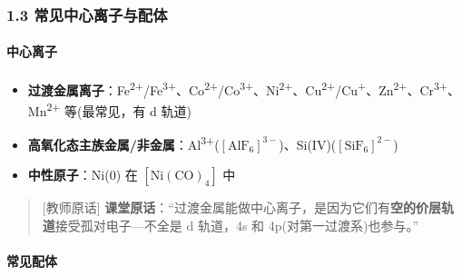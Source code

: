 \subsubsection{1.3 常见中心离子与配体}\label{ux5e38ux89c1ux4e2dux5fc3ux79bbux5b50ux4e0eux914dux4f53}

\paragraph{中心离子}\label{ux4e2dux5fc3ux79bbux5b50}

\begin{itemize}
\tightlist
\item
  \textbf{过渡金属离子}：Fe\textsuperscript{2+}/Fe\textsuperscript{3+}、Co\textsuperscript{2+}/Co\textsuperscript{3+}、Ni\textsuperscript{2+}、Cu\textsuperscript{2+}/Cu\textsuperscript{+}、Zn\textsuperscript{2+}、Cr\textsuperscript{3+}、Mn\textsuperscript{2+} 等(最常见，有 d 轨道)
\item
  \textbf{高氧化态主族金属/非金属}：Al\textsuperscript{3+}(\([\mathrm{AlF_6}]^{3-}\))、Si(IV)(\([\mathrm{SiF_6}]^{2-}\))
\item
  \textbf{中性原子}：Ni(0) 在 \([\mathrm{Ni(CO)_4}]\) 中
\end{itemize}

\begin{quote}
{[}教师原话{]} \textbf{课堂原话}：``过渡金属能做中心离子，是因为它们有\textbf{空的价层轨道}接受孤对电子---不全是 d 轨道，4s 和 4p(对第一过渡系)也参与。''
\end{quote}

\paragraph{常见配体}\label{ux5e38ux89c1ux914dux4f53}

